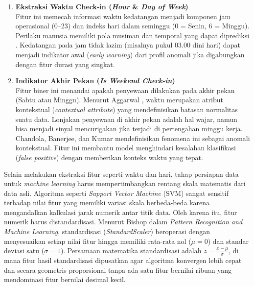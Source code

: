\begin{enumerate}
    Fitur ini krusial untuk mendeteksi penyewa ``transit''. Baesens, Van Vlasselaer, dan Verbeke  \cite{baesens2015fraud} menyatakan bahwa ekstraksi fitur temporal adalah teknik paling efektif dalam sistem deteksi anomali. Sejalan dengan temuan tersebut, Gupta et al.  \cite{gupta2014outlier} menegaskan bahwa anomali temporal sering muncul dalam bentuk durasi kejadian yang terlampau singkat. Dalam konteks sewa properti, durasi inap yang sangat pendek (\textit{micro-stays}) berkorelasi positif dengan aktivitas ilegal.

    \item \textbf{Ekstraksi Waktu Check-in (\textit{Hour} \& \textit{Day of Week})} \\
    Fitur ini memecah informasi waktu kedatangan menjadi komponen jam operasional (0--23) dan indeks hari dalam seminggu (0 = Senin, 6 = Minggu). Perilaku manusia memiliki pola musiman dan temporal yang dapat diprediksi \cite{zheng2014urban}. Kedatangan pada jam tidak lazim (misalnya pukul 03.00 dini hari) dapat menjadi indikator awal (\textit{early warning}) dari profil anomali jika digabungkan dengan fitur durasi yang singkat.

    \item \textbf{Indikator Akhir Pekan (\textit{Is Weekend Check-in})} \\
    Fitur biner ini menandai apakah penyewaan dilakukan pada akhir pekan (Sabtu atau Minggu). Menurut Aggarwal  \cite{aggarwal2017outlier}, waktu merupakan atribut kontekstual (\textit{contextual attribute}) yang mendefinisikan batasan normalitas suatu data. Lonjakan penyewaan di akhir pekan adalah hal wajar, namun bisa menjadi sinyal mencurigakan jika terjadi di pertengahan minggu kerja. Chandola, Banerjee, dan Kumar  \cite{chandola2009anomaly} mendefinisikan fenomena ini sebagai anomali kontekstual. Fitur ini membantu model menghindari kesalahan klasifikasi (\textit{false positive}) dengan memberikan konteks waktu yang tepat.
\end{enumerate}

Selain melakukan ekstraksi fitur seperti waktu dan hari, tahap persiapan data untuk \textit{machine learning} harus mempertimbangkan rentang skala matematis dari data asli. Algoritma seperti \textit{Support Vector Machine} (SVM) sangat sensitif terhadap nilai fitur yang memiliki variasi skala berbeda-beda karena mengandalkan kalkulasi jarak numerik antar titik data. Oleh karena itu, fitur numerik harus distandardisasi. Menurut Bishop  \cite{bishop2006pattern} dalam \textit{Pattern Recognition and Machine Learning}, standardisasi (\textit{StandardScaler}) beroperasi dengan menyesuaikan setiap nilai fitur hingga memiliki rata-rata nol ($\mu = 0$) dan standar deviasi satu ($\sigma = 1$). Persamaan matematika standardisasi adalah $z = \frac{x - \mu}{\sigma}$, di mana fitur hasil standardisasi dipusatkan agar algoritma konvergen lebih cepat dan secara geometris proporsional tanpa ada satu fitur bernilai ribuan yang mendominasi fitur bernilai desimal kecil.

